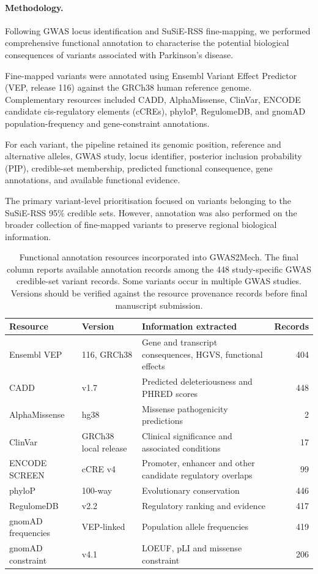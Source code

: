 \documentclass[11pt,a4paper]{article}
\begin{document}
\paragraph{Methodology.}

Following GWAS locus identification and SuSiE-RSS fine-mapping,
we performed comprehensive functional annotation to characterise
the potential biological consequences of variants associated
with Parkinson's disease.

Fine-mapped variants were annotated using Ensembl Variant
Effect Predictor (VEP, release 116) against the GRCh38 human
reference genome. Complementary resources included CADD,
AlphaMissense, ClinVar, ENCODE candidate cis-regulatory elements
(cCREs), phyloP, RegulomeDB, and gnomAD population-frequency
and gene-constraint annotations.

For each variant, the pipeline retained its genomic position,
reference and alternative alleles, GWAS study, locus identifier,
posterior inclusion probability (PIP), credible-set membership,
predicted functional consequence, gene annotations, and
available functional evidence.

The primary variant-level prioritisation focused on variants
belonging to the SuSiE-RSS 95\% credible sets. However,
annotation was also performed on the broader collection
of fine-mapped variants to preserve regional biological
information.

\begin{table}[t]
\centering
\caption{Functional annotation resources incorporated into
GWAS2Mech. The final column reports available annotation
records among the 448 study-specific GWAS credible-set
variant records. Some variants occur in multiple GWAS studies.
Versions should be verified against the resource provenance
records before final manuscript submission.}
\label{tab:annotation_resources}
\footnotesize
\begin{tabular}{@{}p{2.7cm}p{2.0cm}p{7.5cm}r@{}}
\toprule
Resource & Version & Information extracted & Records \\
\midrule
Ensembl VEP & 116, GRCh38
& Gene and transcript consequences, HGVS, functional effects
& 404 \\
CADD & v1.7
& Predicted deleteriousness and PHRED scores
& 448 \\
AlphaMissense & hg38
& Missense pathogenicity predictions
& 2 \\
ClinVar & GRCh38 local release
& Clinical significance and associated conditions
& 17 \\
ENCODE SCREEN & cCRE v4
& Promoter, enhancer and other candidate regulatory overlaps
& 99 \\
phyloP & 100-way
& Evolutionary conservation
& 446 \\
RegulomeDB & v2.2
& Regulatory ranking and evidence
& 417 \\
gnomAD frequencies & VEP-linked
& Population allele frequencies
& 419 \\
gnomAD constraint & v4.1
& LOEUF, pLI and missense constraint
& 206 \\
\bottomrule
\end{tabular}
\end{table}
\end{document}
